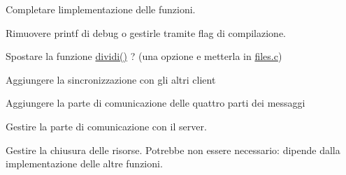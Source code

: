 
\begin{DoxyRefList}
\item[\label{todo__todo000001}%
\Hypertarget{todo__todo000001}%
File \hyperlink{client_8c}{client.c} ]Completare l\textquotesingle{}implementazione delle funzioni. 

Rimuovere printf di debug o gestirle tramite flag di compilazione. 

Spostare la funzione \hyperlink{client_8c_a55586f2b7e9b3620294cf78cda8abdad}{dividi()} ? (una opzione e\textquotesingle{} metterla in \hyperlink{files_8c}{files.\+c})  
\item[\label{todo__todo000004}%
\Hypertarget{todo__todo000004}%
Globale \hyperlink{client_8h_a54b47b58f228d7bc9827d2919687e25a}{operazioni\+\_\+figlio} (char $\ast$file\+Path)]Aggiungere la sincronizzazione con gli altri client

Aggiungere la parte di comunicazione delle quattro parti dei messaggi 
\item[\label{todo__todo000002}%
\Hypertarget{todo__todo000002}%
Globale \hyperlink{client_8h_a48d605ff689f470746c858648f0a98c2}{S\+I\+G\+I\+N\+T\+Signal\+Handler} (int sig)]Gestire la parte di comunicazione con il server. 
\item[\label{todo__todo000003}%
\Hypertarget{todo__todo000003}%
Globale \hyperlink{client_8h_a50b22adcb76198fcd9402a97ff4711bf}{S\+I\+G\+U\+S\+R1\+Signal\+Handler} (int sig)]Gestire la chiusura delle risorse. Potrebbe non essere necessario\+: dipende dalla implementazione delle altre funzioni.
\end{DoxyRefList}